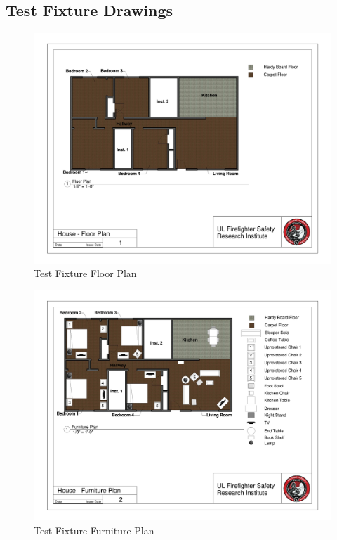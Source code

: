\documentclass[12pt,oneside]{book}
\begin{document}

	




\clearpage

\begin{appendices}

\chapter{Test Fixture Drawings}

\begin{figure}
\includegraphics[width=\textheight]{../0_Images/Appendix_Figures/Floor_Plan}
\caption[]{Test Fixture Floor Plan}
\label{fig:appendix_floorplan}
\end{figure}

\begin{figure}
\includegraphics[width=\textheight]{../0_Images/Appendix_Figures/Furniture_Plan}
\caption[]{Test Fixture Furniture Plan}
\label{fig:appendix_furnitureplan}
\end{figure}


\end{appendices}
\end{document}
